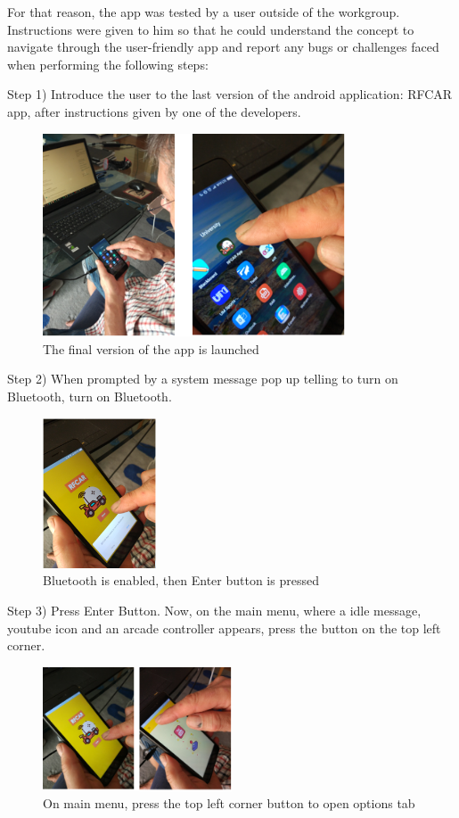 For that reason, the app was tested by a user outside of the workgroup. Instructions were given to him so that he could understand the concept to navigate through the user-friendly app and report any bugs or challenges faced when performing the following steps:

Step 1) Introduce the user to the last version of the android application: RFCAR app, after instructions given by one of the developers.
%
\begin{figure}[!hbt]
\centering
\includegraphics[width=0.8\textwidth]{img/val1.png}
\caption{\label{fig:val1}The final version of the app is launched}
\end{figure}
%

Step 2) When prompted by a system message pop up telling to turn on Bluetooth, turn on Bluetooth.
%
\begin{figure}[!hbt]
\centering
\includegraphics[width=0.3\textwidth]{img/val2.png}
\caption{\label{fig:val2}Bluetooth is enabled, then Enter button is pressed}
\end{figure}
%

Step 3) Press Enter Button. Now, on the main menu, where a idle message, youtube icon and an arcade controller appears, press the button on the top left corner.
%
\begin{figure}[!hbt]
\centering
\includegraphics[width=0.5\textwidth]{img/val3.png}
\caption{\label{fig:val3}On main menu, press the top left corner button to open options tab}
\end{figure}
%

